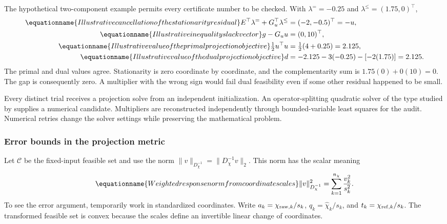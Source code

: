 The hypothetical two-component example permits every certificate number to be checked. With $\lambda^{=}=-0.25$ and $\lambda^\le=(1.75,0)^\top$,
\begin{align}
\equationname{Illustrative cancellation of the stationarity residual}
E^\top\lambda^=+G_u^\top\lambda^\le&=(-2,-0.5)^\top=-u,\\
\equationname{Illustrative inequality slack vector}
g-G_uu&=(0,10)^\top,\\
\equationname{Illustrative value of the primal projection objective}
\tfrac12u^\top u&=\tfrac12(4+0.25)=2.125,\\
\equationname{Illustrative value of the dual projection objective}
d&=-2.125-3(-0.25)-[-2(1.75)]=2.125.
\end{align}
The primal and dual values agree. Stationarity is zero coordinate by coordinate, and the complementarity sum is $1.75(0)+0(10)=0$. The gap is consequently zero. A multiplier with the wrong sign would fail dual feasibility even if some other residual happened to be small.

Every distinct trial receives a projection solve from an independent initialization. An operator-splitting quadratic solver of the type studied by \citet{Stellato2020} supplies a numerical candidate. Multipliers are reconstructed independently through bounded-variable least squares for the audit. Numerical retries change the solver settings while preserving the mathematical problem.

\subsubsection{Error bounds in the projection metric}

Let $\mathcal C$ be the fixed-input feasible set and use the norm
$\|v\|_{D_\chi^{-1}}=\|D_\chi^{-1}v\|_2$. This norm has the scalar meaning
\begin{equation}
\equationname{Weighted response norm from coordinate scales}
\|v\|_{D_\chi^{-1}}^2=\sum_{k=1}^{n_\chi}\frac{v_k^2}{s_k^2}.
\end{equation}
To see the error argument, temporarily work in standardized coordinates. Write $a_k=\chi_{{\rm raw},k}/s_k$, $q_k=\widehat\chi_k/s_k$, and $t_k=\chi_{{\rm ref},k}/s_k$. The transformed feasible set is convex because the scales define an invertible linear change of coordinates.

